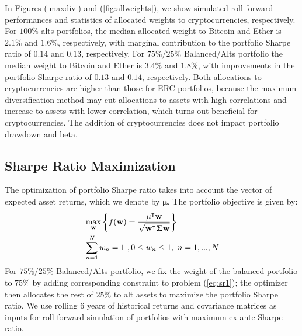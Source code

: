 \documentclass[pdftex,11pt,a4paper] {article}
\begin{document}
In Figures (\ref{maxdiv}) and (\ref{fig:allweights}), we show simulated roll-forward performances and statistics of allocated weights to cryptocurrencies, respectively. For $100\%$ alts portfolios, the median allocated weight to Bitcoin and Ether is $2.1\%$ and $1.6\%$, respectively, with marginal contribution to the portfolio Sharpe ratio of $0.14$ and $0.13$, respectively. For $75\%/25\%$ Balanced/Alts portfolio the median weight to Bitcoin and Ether is $3.4\%$ and $1.8\%$, with improvements in the portfolio Sharpe ratio of $0.13$ and $0.14$, respectively. Both allocations to cryptocurrencies are higher than those for ERC portfolios, because the maximum diversification method may cut allocations to assets with high correlations and increase to assets with lower correlation, which turns out beneficial for cryptocurrencies. The addition of cryptocurrencies does not impact portfolio drawdown and beta.



\subsection{Sharpe Ratio Maximization}

The optimization of portfolio Sharpe ratio takes into account the vector of expected asset returns, which we denote by $\mathbf{\mu}$. The portfolio objective is given by:\vspace*{-0.5\baselineskip}
\begin{equation}\label{eq:sr1}
\begin{split}
  & \max_{\mathbf{w}} \left\{ f(\mathbf{w})   = \frac{\mathbf{\mu}^{\intercal}\mathbf{w}}{\sqrt{\mathbf{w}^{\intercal}\mathbf{\Sigma}\mathbf{w}}}    \right\}  \\
	&   \sum^{N}_{n=1}w_{n}= 1 \ ,  0 \leq w_{n} \leq 1, \ n= 1,...,N\vspace*{-0.5\baselineskip}
\end{split}
\end{equation}
For $75\%/25\%$ Balanced/Alts portfolio, we fix the weight of the balanced portfolio to $75\%$ by adding corresponding constraint to problem (\ref{eq:sr1}); the optimizer then allocates the rest of $25\%$ to alt assets to maximize the portfolio Sharpe ratio. We use rolling 6 years of historical returns and covariance matrices as inputs for roll-forward simulation of portfolios with maximum ex-ante Sharpe ratio. 
\end{document}
